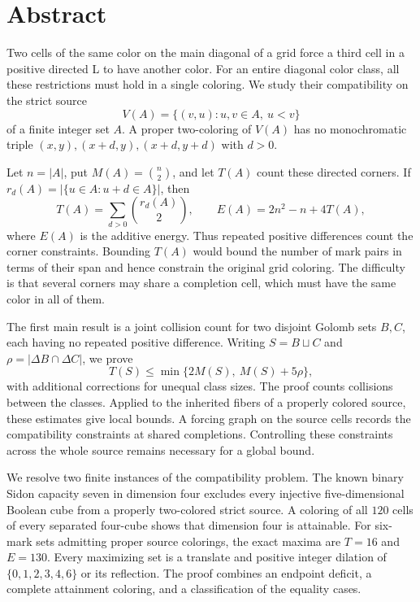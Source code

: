 \documentclass[11pt,a4paper]{article}
\newif\ifshowrevisions
\newenvironment{revision}{\par\begingroup\ifshowrevisions\color{red}\fi}{\par\endgroup}
\theoremstyle{definition}
\numberwithin{equation}{section}
\begin{document}
\section*{Abstract}
\begin{revision}
Two cells of the same color on the main diagonal of a grid force a third cell in a positive directed L to have another color. For an entire diagonal color class, all these restrictions must hold in a single coloring. We study their compatibility on the strict source
\[
V(A)=\{(v,u):u,v\in A,\ u<v\}
\]
of a finite integer set $A$. A proper two-coloring of $V(A)$ has no monochromatic triple $(x,y),(x+d,y),(x+d,y+d)$ with $d>0$.

Let $n=|A|$, put $M(A)=\binom n2$, and let $T(A)$ count these directed corners. If $r_d(A)=|\{u\in A:u+d\in A\}|$, then
\[
T(A)=\sum_{d>0}\binom{r_d(A)}2,
\qquad E(A)=2n^2-n+4T(A),
\]
where $E(A)$ is the additive energy. Thus repeated positive differences count the corner constraints. Bounding $T(A)$ would bound the number of mark pairs in terms of their span and hence constrain the original grid coloring. The difficulty is that several corners may share a completion cell, which must have the same color in all of them.

The first main result is a joint collision count for two disjoint Golomb sets $B,C$, each having no repeated positive difference. Writing $S=B\sqcup C$ and $\rho=|\Delta B\cap\Delta C|$, we prove
\[
T(S)\le\min\{2M(S),\ M(S)+5\rho\},
\]
with additional corrections for unequal class sizes. The proof counts collisions between the classes. Applied to the inherited fibers of a properly colored source, these estimates give local bounds. A forcing graph on the source cells records the compatibility constraints at shared completions. Controlling these constraints across the whole source remains necessary for a global bound.

We resolve two finite instances of the compatibility problem. The known binary Sidon capacity seven in dimension four excludes every injective five-dimensional Boolean cube from a properly two-colored strict source. A coloring of all $120$ cells of every separated four-cube shows that dimension four is attainable. For six-mark sets admitting proper source colorings, the exact maxima are $T=16$ and $E=130$. Every maximizing set is a translate and positive integer dilation of $\{0,1,2,3,4,6\}$ or its reflection. The proof combines an endpoint deficit, a complete attainment coloring, and a classification of the equality cases.


\end{revision}
\end{document}
